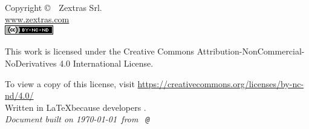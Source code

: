
\newpage
~\vfill
\thispagestyle{empty}

Copyright \copyright\ \the\year\ Zextras Srl.\\ %

\url{www.zextras.com}\\ %

\begingroup
    \normalfont
    \includegraphics[height=\fontcharht\font`\B]{images/cc-by-nc-sa.png}
\endgroup

This work is licensed under the Creative Commons Attribution-NonCommercial-NoDerivatives 4.0 International License.

To view a copy of this license, visit \url{https://creativecommons.org/licenses/by-nc-nd/4.0/}\\

Written in \LaTeX because developers \ExcuseToUseLatex.\\

\textit{Document built on \today\ from \texttt{\branchName\ @\href{https://github.com/ZeXtras/OpenChat/tree/\commitId}{\shortCommitId}}} %
